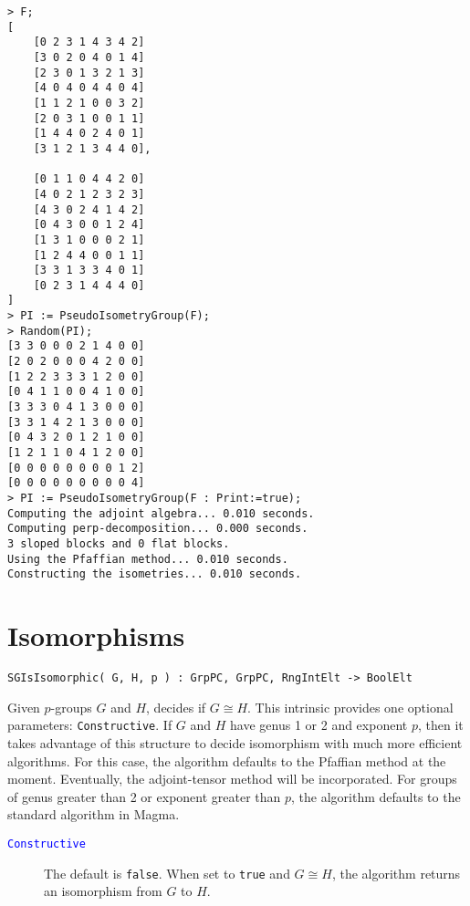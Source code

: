 \documentclass{documentation}
\begin{document}
\begin{lstlisting}[frame=single,basicstyle=\ttfamily\color{black!30!teal},backgroundcolor=\color{white!70!gray}]
> F;
[
    [0 2 3 1 4 3 4 2]
    [3 0 2 0 4 0 1 4]
    [2 3 0 1 3 2 1 3]
    [4 0 4 0 4 4 0 4]
    [1 1 2 1 0 0 3 2]
    [2 0 3 1 0 0 1 1]
    [1 4 4 0 2 4 0 1]
    [3 1 2 1 3 4 4 0],

    [0 1 1 0 4 4 2 0]
    [4 0 2 1 2 3 2 3]
    [4 3 0 2 4 1 4 2]
    [0 4 3 0 0 1 2 4]
    [1 3 1 0 0 0 2 1]
    [1 2 4 4 0 0 1 1]
    [3 3 1 3 3 4 0 1]
    [0 2 3 1 4 4 4 0]
]
> PI := PseudoIsometryGroup(F);
> Random(PI);
[3 3 0 0 0 2 1 4 0 0]
[2 0 2 0 0 0 4 2 0 0]
[1 2 2 3 3 3 1 2 0 0]
[0 4 1 1 0 0 4 1 0 0]
[3 3 3 0 4 1 3 0 0 0]
[3 3 1 4 2 1 3 0 0 0]
[0 4 3 2 0 1 2 1 0 0]
[1 2 1 1 0 4 1 2 0 0]
[0 0 0 0 0 0 0 0 1 2]
[0 0 0 0 0 0 0 0 0 4]
> PI := PseudoIsometryGroup(F : Print:=true);
Computing the adjoint algebra... 0.010 seconds.
Computing perp-decomposition... 0.000 seconds.
3 sloped blocks and 0 flat blocks.
Using the Pfaffian method... 0.010 seconds.
Constructing the isometries... 0.010 seconds.
\end{lstlisting}

\color{black}
\chapter{Isomorphisms}

\color{blue}
\begin{verbatim}
SGIsIsomorphic( G, H, p ) : GrpPC, GrpPC, RngIntElt -> BoolElt
\end{verbatim}

\color{black}
Given $p$-groups $G$ and $H$, decides if $G\cong H$.
This intrinsic provides one optional parameters: {\tt Constructive}. 
If $G$ and $H$ have genus 1 or 2 and exponent $p$, then it takes advantage of this structure 
to decide isomorphism with much more efficient algorithms. 
For this case, the algorithm defaults to the Pfaffian method at the moment. 
Eventually, the adjoint-tensor method will be incorporated.
For groups of genus greater than 2 or exponent greater than $p$, the algorithm defaults to the standard algorithm in {\sc Magma}.

\begin{description}
\item[\textcolor{blue}{\tt Constructive}]
The default is {\tt false}. 
When set to {\tt true} and $G\cong H$, the algorithm returns an isomorphism from $G$ to $H$.
\end{description}
\end{document}
